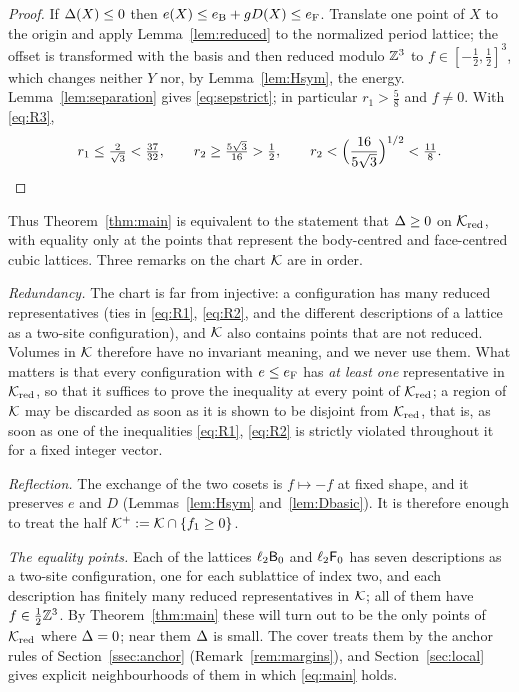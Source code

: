 \begin{proof}
If $\Delta(X)\le0$ then $e(X)\le e_{\mathrm B}+g D(X)\le e_{\mathrm F}$. Translate one point of $X$ to the origin and apply Lemma~\ref{lem:reduced} to the
normalized period lattice; the offset is transformed with the basis and then reduced modulo $\mathbb Z^3$ to $f\in[-\frac12,\frac12]^3$, which
changes neither $Y$ nor, by Lemma~\ref{lem:Hsym}, the energy. Lemma~\ref{lem:separation} gives \eqref{eq:sepstrict}; in particular
$r_1>\frac58$ and $f\ne0$. With \eqref{eq:R3},
\[
  r_1\le\tfrac2{\sqrt3}<\tfrac{37}{32},\qquad r_2\ge\tfrac{5\sqrt3}{16}>\tfrac12,\qquad r_2<\Bigl(\frac{16}{5\sqrt3}\Bigr)^{1/2}<\tfrac{11}8 .\qedhere
\]
\end{proof}

Thus Theorem~\ref{thm:main} is equivalent to the statement that $\Delta\ge0$ on $\mathcal K_{\mathrm{red}}$, with equality only at the
points that represent the body-centred and face-centred cubic lattices. Three remarks on the chart $\mathcal K$ are in order.

\emph{Redundancy.} The chart is far from injective: a configuration has many reduced representatives (ties in \eqref{eq:R1},
\eqref{eq:R2}, and the different descriptions of a lattice as a two-site configuration), and $\mathcal K$ also contains points that are not
reduced. Volumes in $\mathcal K$ therefore have no invariant meaning, and we never use them. What matters is that every configuration with
$e\le e_{\mathrm F}$ has \emph{at least one} representative in $\mathcal K_{\mathrm{red}}$, so that it suffices to prove the inequality at every point
of $\mathcal K_{\mathrm{red}}$; a region of $\mathcal K$ may be discarded as soon as it is shown to be disjoint from $\mathcal K_{\mathrm{red}}$, that is,
as soon as one of the inequalities \eqref{eq:R1}, \eqref{eq:R2} is strictly violated throughout it for a fixed integer vector.

\emph{Reflection.} The exchange of the two cosets is $f\mapsto-f$ at fixed shape, and it preserves $e$ and $D$ (Lemmas~\ref{lem:Hsym}
and~\ref{lem:Dbasic}). It is therefore enough to treat the half $\mathcal K^+:=\mathcal K\cap\{f_1\ge0\}$.

\emph{The equality points.} Each of the lattices $\ell_2\mathsf B_0$ and $\ell_2\mathsf F_0$ has seven descriptions as a two-site configuration, one for
each sublattice of index two, and each description has finitely many reduced representatives in $\mathcal K$; all of them have
$f\in\frac12\mathbb Z^3$. By Theorem~\ref{thm:main} these will turn out to be the only points of $\mathcal K_{\mathrm{red}}$ where $\Delta=0$; near
them $\Delta$ is small. The cover treats them by the anchor rules of Section~\ref{ssec:anchor} (Remark~\ref{rem:margins}), and
Section~\ref{sec:local} gives explicit neighbourhoods of them in which \eqref{eq:main} holds.
